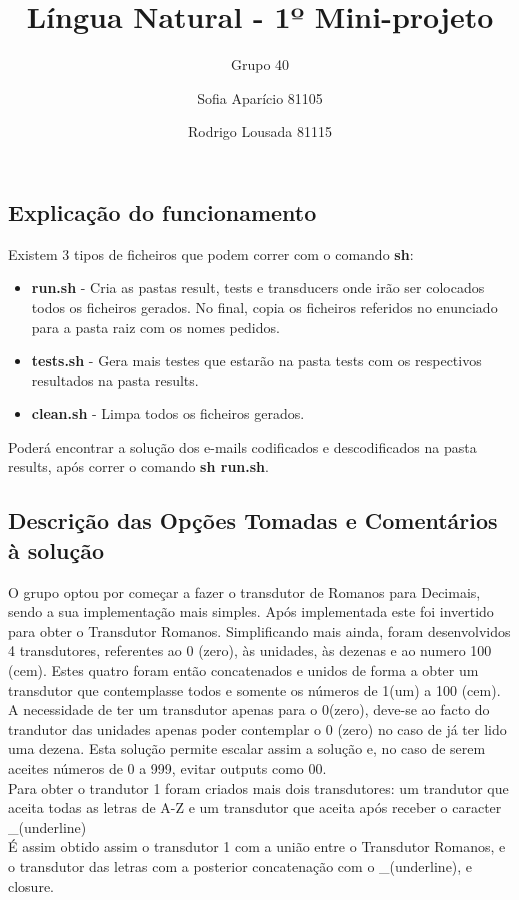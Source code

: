 \documentclass{article}
\newcommand\tab[1][1cm]{\hspace*{#1}}
\begin{document}
\title{Língua Natural - 1º Mini-projeto}
\author{Grupo 40 \and Sofia Aparício 81105 \and Rodrigo Lousada 81115}
\maketitle

\subsection*{Explicação do funcionamento}
 Existem 3 tipos de ficheiros que podem correr com o comando \textbf{sh}:
 \begin{itemize}
\item\textbf{run.sh} - Cria as pastas result, tests e transducers onde irão ser colocados todos os ficheiros gerados. No final, copia os ficheiros referidos no enunciado para a pasta raiz com os nomes pedidos.
 \item\textbf{tests.sh} - Gera mais testes que estarão na pasta tests com os respectivos resultados na pasta results.
 \item\textbf{clean.sh} - Limpa todos os ficheiros gerados.
\end{itemize}
Poderá encontrar a solução dos e-mails codificados e descodificados na pasta results, após correr o comando \textbf{sh run.sh}.

\subsection*{Descrição das Opções Tomadas e Comentários à solução}
\tab O grupo optou por começar a fazer o transdutor de Romanos para Decimais, sendo a sua implementação mais simples. Após implementada este foi invertido para obter o Transdutor Romanos. Simplificando mais ainda,  foram desenvolvidos 4 transdutores, referentes ao 0 (zero), às unidades, às dezenas e ao numero 100 (cem). Estes quatro foram então concatenados e unidos de forma a obter um transdutor que contemplasse todos e somente os números de 1(um) a 100 (cem). \\
A necessidade de ter um transdutor apenas para o 0(zero), deve-se ao facto do trandutor das unidades apenas poder contemplar o 0 (zero) no caso de já ter lido uma dezena. Esta solução permite escalar assim a solução e, no caso de serem aceites números de 0 a 999, evitar outputs como 00.\\

Para obter o trandutor 1 foram criados mais dois transdutores: um trandutor que aceita todas as letras de A-Z e um transdutor que aceita após receber o caracter \_(underline)\\
É assim obtido assim o transdutor 1 com a união entre o Transdutor Romanos, e o transdutor das letras com a posterior concatenação com o \_(underline), e closure.\\
\end{document}
